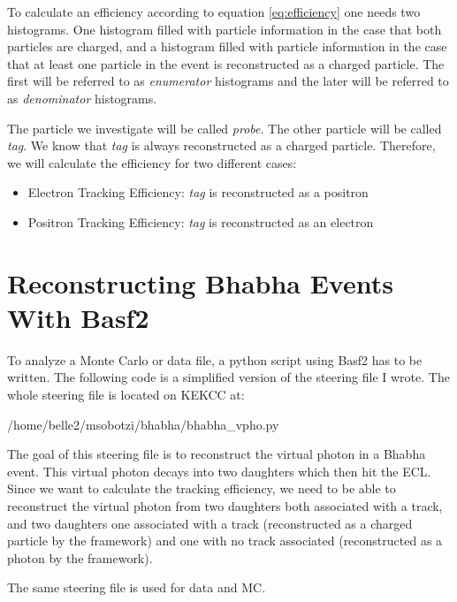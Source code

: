 \documentclass[a4paper,11pt,twosided,final,german,openbib,pdftex,listof=totoc,bibliography=totoc]{scrbook}
\begin{document}
To calculate an efficiency according to equation \ref{eq:efficiency} one needs two histograms. One histogram filled with particle information in the case that both particles are charged, and a histogram filled with particle information in the case that at least one particle in the event is reconstructed as a charged particle. The first will be referred to as \textit{enumerator} histograms and the later will be referred to as \textit{denominator} histograms.


The particle we investigate will be called \textit{probe}. The other particle will be called \textit{tag}. We know that \textit{tag} is always reconstructed as a charged particle. Therefore, we will calculate the efficiency for two different cases:

\begin{itemize}
	
	\item Electron Tracking Efficiency: \textit{tag} is reconstructed as a positron
	\item Positron Tracking Efficiency: \textit{tag} is reconstructed as an electron
\end{itemize}





\section{Reconstructing Bhabha Events With Basf2}
\label{sec:RecBasf2}


To analyze a Monte Carlo or data file, a python script using Basf2 has to be written. The following code is a simplified version of the steering file I wrote. 
The whole steering file is located on KEKCC at:


/home/belle2/msobotzi/bhabha/bhabha\_vpho.py
\newline


The goal of this steering file is to reconstruct the virtual photon in a Bhabha event. This virtual photon decays into two daughters which then hit the ECL. Since we want to calculate the tracking efficiency, we need to be able to reconstruct the virtual photon from two daughters both associated with a track, and two daughters one associated with a track (reconstructed as a charged particle by the framework) and one with no track associated (reconstructed as a photon by the framework).

The same steering file is used for data and MC.
\newline 
\end{document}
